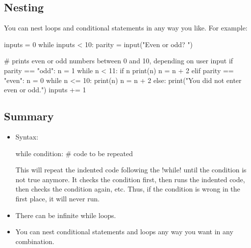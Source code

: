 \documentclass[11pt]{cselabheader}
\begin{document}
\subsection{Nesting}

You can nest loops and conditional statements in any way you
like. For example:

\begin{python3code}
inputs = 0
while inputs < 10:
    parity = input("Even or odd? ")

    # prints even or odd numbers between 0 and 10, depending on user input
    if parity == "odd":
        n = 1
        while n < 11:
            if n %
                print(n)
            n = n + 2
    elif parity == "even":
        n = 0
        while n <= 10:
            print(n)
            n = n + 2
    else:
        print("You did not enter even or odd.")
    inputs += 1
\end{python3code}

\subsection{Summary}

\begin{itemize}
    \item Syntax:

      \begin{python3code}
while condition:
    # code to be repeated
      \end{python3code}

    This will repeat the indented code following the \pythoninline!while! until
    the condition is not true anymore. It checks the condition first, then runs
    the indented code, then checks the condition again, etc. Thus, if the
    condition is wrong in the first place, it will never run.

%
%

  \item There can be infinite while loops.
  \item You can nest conditional statements and loops any way you want in any
    combination.
\end{itemize}
\end{document}
